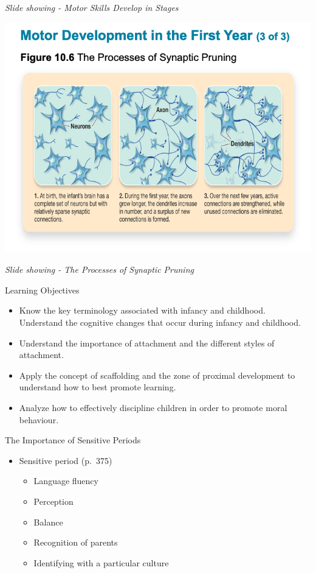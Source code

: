 \documentclass[
]{book}
\providecommand{\tightlist}{%
  \setlength{\itemsep}{0pt}\setlength{\parskip}{0pt}}
\begin{document}
\emph{Slide showing - Motor Skills Develop in Stages}

\includegraphics{assets/unit_3/slide_20.png}

\emph{Slide showing - The Processes of Synaptic Pruning}

Learning Objectives

\begin{itemize}
\tightlist
\item
  Know the key terminology associated with infancy and childhood.
  Understand the cognitive changes that occur during infancy and childhood.
\item
  Understand the importance of attachment and the different styles of attachment.
\item
  Apply the concept of scaffolding and the zone of proximal development to understand how to best promote learning.
\item
  Analyze how to effectively discipline children in order to promote moral behaviour.
\end{itemize}

The Importance of Sensitive Periods

\begin{itemize}
\tightlist
\item
  Sensitive period (p.~375)

  \begin{itemize}
  \tightlist
  \item
    Language fluency
  \item
    Perception
  \item
    Balance
  \item
    Recognition of parents
  \item
    Identifying with a particular culture
  \end{itemize}
\end{itemize}
\end{document}
